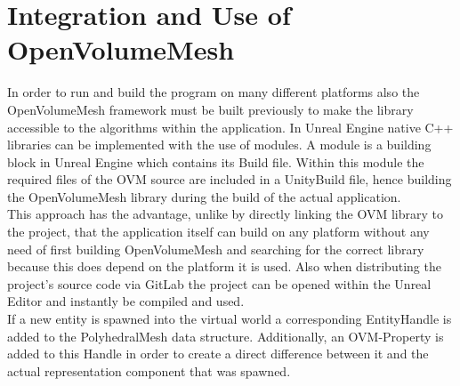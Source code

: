 \documentclass{report}
\begin{document}
	\section{Integration and Use of OpenVolumeMesh}
	\startsection
		In order to run and build the program on many different platforms also the OpenVolumeMesh framework must be built previously to make the library accessible to the algorithms within the application. In Unreal Engine native C++ libraries can be implemented with the use of modules. A module is a building block in Unreal Engine which contains its Build file. Within this module the required files of the OVM source are included in a UnityBuild file, hence building the OpenVolumeMesh library during the build of the actual application. \\
		This approach has the advantage, unlike by directly linking the OVM library to the project, that the application itself can build on any platform without any need of first building OpenVolumeMesh and searching for the correct library because this does depend on the platform it is used. Also when distributing the project's source code via GitLab the project can be opened within the Unreal Editor and instantly be compiled and used. \\
		If a new entity is spawned into the virtual world a corresponding EntityHandle is added to the PolyhedralMesh data structure. Additionally, an OVM-Property is added to this Handle in order to create a direct difference between it and the actual representation component that was spawned.
	\closesection
	
\end{document}
